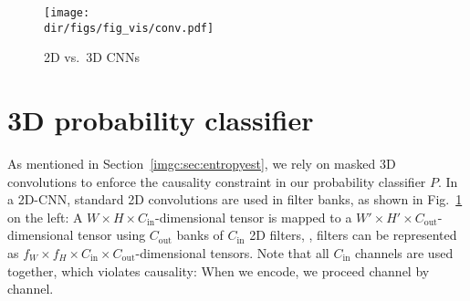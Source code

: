 \begin{subappendices}

\begin{figure}[ht]
\centering
\texttt{[image: \\dir/figs/fig\_vis/conv.pdf]}
\caption{2D vs.\ 3D CNNs}
\label{imgc:fig:conv_2dvs3d}
\end{figure}

\section{3D probability classifier} \label{imgcomp:sec:app:probclf}

As mentioned in Section~\ref{imgc:sec:entropyest}, we rely on masked 3D convolutions to enforce the causality constraint in our probability classifier $P$. In a 2D-CNN, standard 2D convolutions are used in filter banks, as shown in Fig.~\ref{imgc:fig:conv_2dvs3d} on the left: A $W \times H \times C_\text{in}$-dimensional tensor is mapped to a $W' \times H' \times C_\text{out}$-dimensional tensor using $C_\text{out}$ banks of $C_\text{in}$ 2D filters, \ie, filters can be represented as $f_W \times f_H \times C_\text{in} \times C_\text{out}$-dimensional tensors. Note that all $C_\text{in}$ channels are used together, which violates causality: When we encode, we proceed channel by channel.


\end{subappendices}
